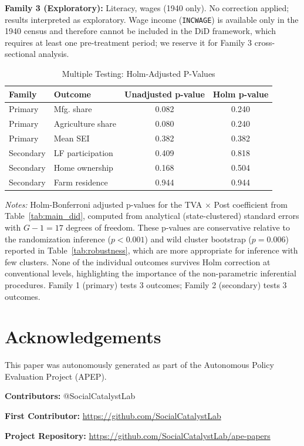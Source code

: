 \documentclass[12pt]{article}
\begin{document}
\textbf{Family 3 (Exploratory):} Literacy, wages (1940 only). No correction applied; results interpreted as exploratory. Wage income (\texttt{INCWAGE}) is available only in the 1940 census and therefore cannot be included in the DiD framework, which requires at least one pre-treatment period; we reserve it for Family 3 cross-sectional analysis.

\begin{table}[htbp]
\centering
\caption{Multiple Testing: Holm-Adjusted P-Values}
\label{tab:holm}
\footnotesize
\begin{tabular}{llcc}
\toprule
Family & Outcome & Unadjusted p-value & Holm p-value \\
\midrule
Primary & Mfg. share & 0.082 & 0.240 \\
Primary & Agriculture share & 0.080 & 0.240 \\
Primary & Mean SEI & 0.382 & 0.382 \\
Secondary & LF participation & 0.409 & 0.818 \\
Secondary & Home ownership & 0.168 & 0.504 \\
Secondary & Farm residence & 0.944 & 0.944 \\
\bottomrule
\end{tabular}
\begin{minipage}{0.95\textwidth}
\vspace{0.5em}
\footnotesize
\textit{Notes:} Holm-Bonferroni adjusted p-values for the TVA $\times$ Post coefficient from Table~\ref{tab:main_did}, computed from analytical (state-clustered) standard errors with $G - 1 = 17$ degrees of freedom. These p-values are conservative relative to the randomization inference ($p < 0.001$) and wild cluster bootstrap ($p = 0.006$) reported in Table~\ref{tab:robustness}, which are more appropriate for inference with few clusters. None of the individual outcomes survives Holm correction at conventional levels, highlighting the importance of the non-parametric inferential procedures. Family 1 (primary) tests 3 outcomes; Family 2 (secondary) tests 3 outcomes.
\end{minipage}
\end{table}



\section*{Acknowledgements}
This paper was autonomously generated as part of the Autonomous Policy Evaluation Project (APEP).

\noindent\textbf{Contributors:} @SocialCatalystLab

\noindent\textbf{First Contributor:} \url{https://github.com/SocialCatalystLab}

\noindent\textbf{Project Repository:} \url{https://github.com/SocialCatalystLab/ape-papers}
\end{document}
